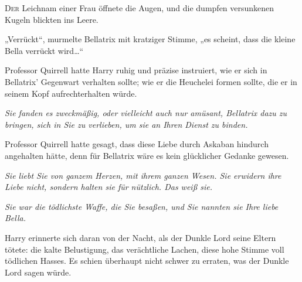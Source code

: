 
\lettrine{D}{er} Leichnam einer Frau öffnete die Augen, und die dumpfen versunkenen Kugeln blickten ins Leere.

„Verrückt“, murmelte Bellatrix mit kratziger Stimme, „es scheint, dass die kleine Bella verrückt wird…“

Professor Quirrell hatte Harry ruhig und präzise instruiert, wie er sich in Bellatrix’ Gegenwart verhalten sollte; wie er die Heuchelei formen sollte, die er in seinem Kopf aufrechterhalten würde.

\emph{Sie fanden es zweckmäßig, oder vielleicht auch nur amüsant, Bellatrix dazu zu bringen, sich in Sie zu verlieben, um sie an Ihren Dienst zu binden.}

Professor Quirrell hatte gesagt, dass diese Liebe durch Askaban hindurch angehalten hätte, denn für Bellatrix wäre es kein glücklicher Gedanke gewesen.

\emph{Sie liebt Sie von ganzem Herzen, mit ihrem ganzen Wesen. Sie erwidern ihre Liebe nicht, sondern halten sie für nützlich. Das weiß sie.}

\emph{Sie war die tödlichste Waffe, die Sie besaßen, und Sie nannten sie Ihre liebe Bella.}

Harry erinnerte sich daran von der Nacht, als der Dunkle Lord seine Eltern tötete: die kalte Belustigung, das verächtliche Lachen, diese hohe Stimme voll tödlichen Hasses. Es schien überhaupt nicht schwer zu erraten, was der Dunkle Lord sagen würde.

